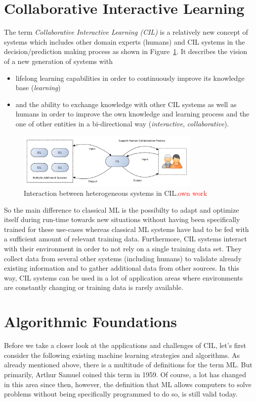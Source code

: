 \documentclass[conference]{IEEEtran}
\newcommand\notes[1]{\textcolor{red}{#1}}
\begin{document}
\section{Collaborative Interactive Learning}\label{sec:cil}
The term \textit{Collaborative Interactive Learning (CIL)} is a relatively new concept of systems which 
includes other domain experts (humans) and CIL systems in the decision/prediction making process 
as shown in Figure~\ref{fig:CIL}. It describes the vision of a new 
generation of systems with
\begin{itemize}
    \item lifelong learning capabilities in order to continuously improve its 
        knowledge base (\textit{learning})
    \item and the ability to exchange knowledge with other CIL systems as well as humans 
        in order to improve the own knowledge and learning process and the one of other entities in a 
        bi-directional way (\textit{interactive}, \textit{collaborative})\cite{CIL:sick}.
\end{itemize}
\begin{figure}[!h]
\centering
\includegraphics[width=3.5in]{images/CIL}
\caption{Interaction between heterogeneous systems in CIL.\notes{own work}}
\label{fig:CIL}
\end{figure}
So the main difference to classical ML is the possibilty to adapt and optimize itself during run-time 
towards new situations without having been specifically trained for these use-cases whereas classical ML 
systems have had to be fed with a sufficient amount of relevant training data\cite{CIL:sick}\cite{Organic:schloer}.
Furthermore, CIL systems interact with their environment in order to not rely on a single training data set. 
They collect data from several other systems (including humans) to validate already existing information and to 
gather additional data from other sources. In this way, CIL systems can be used in a lot of application areas where 
environments are constantly changing or training data is rarely available.

\section{Algorithmic Foundations}
\label{sec:algos}
Before we take a closer look at the applications and challenges of CIL, let's first consider the 
following existing machine learning strategies and algorithms. As already mentioned above, 
there is a multitude of definitions for the term ML\@. But primarily, Arthur Samuel 
coined this term in 1959. Of course, a lot has changed in this area since then, 
however, the definition that ML allows computers to solve problems without being 
specifically programmed to do so, is still valid today\cite{MLStudiesUsingCheckers:samuel}.
\end{document}
